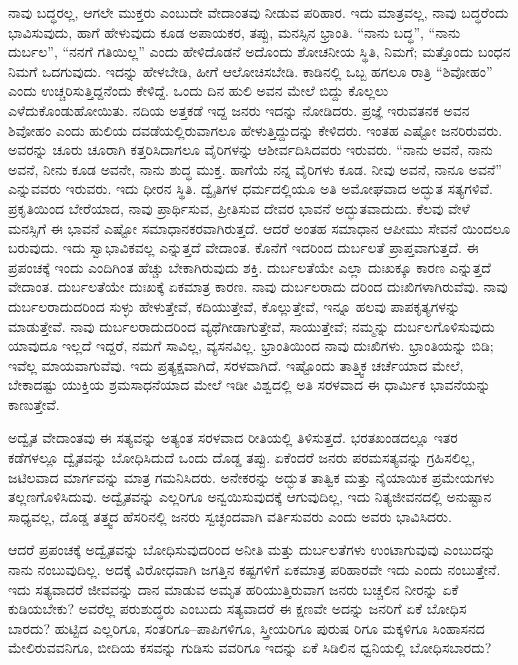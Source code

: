 ನಾವು ಬದ್ಧರಲ್ಲ, ಆಗಲೇ ಮುಕ್ತರು ಎಂಬುದೇ ವೇದಾಂತವು ನೀಡುವ ಪರಿಹಾರ. ಇದು ಮಾತ್ರವಲ್ಲ, ನಾವು ಬದ್ಧರೆಂದು ಭಾವಿಸುವುದು, ಹಾಗೆ ಹೇಳುವುದು ಕೂಡ ಅಪಾಯಕರ, ತಪ್ಪು, ಮನಸ್ಸಿನ ಭ್ರಾಂತಿ. “ನಾನು ಬದ್ಧ”, “ನಾನು ದುರ್ಬಲ”, “ನನಗೆ ಗತಿಯಿಲ್ಲ” ಎಂದು ಹೇಳಿದೊಡನೆ ಅದೊಂದು ಶೋಚನೀಯ ಸ್ಥಿತಿ, ನಿಮಗೆ; ಮತ್ತೊಂದು ಬಂಧನ ನಿಮಗೆ ಒದಗುವುದು. ಇದನ್ನು ಹೇಳಬೇಡಿ, ಹೀಗೆ ಆಲೋಚಿಸಬೇಡಿ. ಕಾಡಿನಲ್ಲಿ ಒಬ್ಬ ಹಗಲೂ ರಾತ್ರಿ “ಶಿವೋಹಂ” ಎಂದು ಉಚ್ಚರಿಸುತ್ತಿದ್ದನೆಂದು ಕೇಳಿದ್ದೆ. ಒಂದು ದಿನ ಹುಲಿ ಅವನ ಮೇಲೆ ಬಿದ್ದು ಕೊಲ್ಲಲು ಎಳೆದುಕೊಂಡುಹೋಯಿತು. ನದಿಯ ಅತ್ತಕಡೆ ಇದ್ದ ಜನರು ಇದನ್ನು ನೋಡಿದರು. ಪ್ರಜ್ಞೆ ಇರುವತನಕ ಅವನ ಶಿವೋಹಂ ಎಂದು ಹುಲಿಯ ದವಡೆಯಲ್ಲಿರುವಾಗಲೂ ಹೇಳುತ್ತಿದ್ದುದನ್ನು ಕೇಳಿದರು. ಇಂತಹ ಎಷ್ಟೋ ಜನರಿರುವರು. ಅವರನ್ನು ಚೂರು ಚೂರಾಗಿ ಕತ್ತರಿಸಿದಾಗಲೂ ವೈರಿಗಳನ್ನು ಆಶೀರ್ವದಿಸಿದವರು ಇರುವರು. “ನಾನು ಅವನೆ, ನಾನು ಅವನೆ, ನೀನು ಕೂಡ ಅವನೇ, ನಾನು ಶುದ್ಧ ಮುಕ್ತ. ಹಾಗೆಯೆ ನನ್ನ ವೈರಿಗಳು ಕೂಡ. ನೀವು ಅವನೆ, ನಾನೂ ಅವನೆ” ಎನ್ನುವವರು ಇರುವರು. ಇದು ಧೀರನ ಸ್ಥಿತಿ. ದ್ವೈತಿಗಳ ಧರ್ಮದಲ್ಲಿಯೂ ಅತಿ ಅಮೋಘವಾದ ಅದ್ಭುತ ಸತ್ಯಗಳಿವೆ. ಪ್ರಕೃತಿಯಿಂದ ಬೇರೆಯಾದ, ನಾವು ಪ್ರಾರ್ಥಿಸುವ, ಪ್ರೀತಿಸುವ ದೇವರ ಭಾವನೆ ಅದ್ಭುತವಾದುದು. ಕೆಲವು ವೇಳೆ ಮನಸ್ಸಿಗೆ ಈ ಭಾವನೆ ಎಷ್ಟೋ ಸಮಾಧಾನಕರವಾಗಿರುತ್ತದೆ. ಆದರೆ ಅಂತಹ ಸಮಾಧಾನ ಆಪೀಮು ಸೇವನೆ ಯಿಂದಲೂ ಬರುವುದು. ಇದು ಸ್ವಾಭಾವಿಕವಲ್ಲ ಎನ್ನುತ್ತದೆ ವೇದಾಂತ. ಕೊನೆಗೆ ಇದರಿಂದ ದುರ್ಬಲತೆ ಪ್ರಾಪ್ತವಾಗುತ್ತದೆ. ಈ ಪ್ರಪಂಚಕ್ಕೆ ಇಂದು ಎಂದಿಗಿಂತ ಹೆಚ್ಚು ಬೇಕಾಗಿರುವುದು ಶಕ್ತಿ. ದುರ್ಬಲತೆಯೇ ಎಲ್ಲಾ ದುಃಖಕ್ಕೂ ಕಾರಣ ಎನ್ನುತ್ತದೆ ವೇದಾಂತ. ದುರ್ಬಲತೆಯೇ ದುಃಖಕ್ಕೆ ಏಕಮಾತ್ರ ಕಾರಣ. ನಾವು ದುರ್ಬಲರಾದು ದರಿಂದ ದುಃಖಿಗಳಾಗಿರುವೆವು. ನಾವು ದುರ್ಬಲರಾದುದರಿಂದ ಸುಳ್ಳು ಹೇಳುತ್ತೇವೆ, ಕದಿಯುತ್ತೇವೆ, ಕೊಲ್ಲುತ್ತೇವೆ, ಇನ್ನೂ ಹಲವು ಪಾಪಕೃತ್ಯಗಳನ್ನು ಮಾಡುತ್ತೇವೆ. ನಾವು ದುರ್ಬಲರಾದುದರಿಂದ ವ್ಯಥೆಗೀಡಾಗುತ್ತೇವೆ, ಸಾಯುತ್ತೇವೆ; ನಮ್ಮನ್ನು ದುರ್ಬಲಗೊಳಿಸುವುದು ಯಾವುದೂ ಇಲ್ಲದೆ ಇದ್ದರೆ, ನಮಗೆ ಸಾವಿಲ್ಲ, ವ್ಯಸನವಿಲ್ಲ. ಭ್ರಾಂತಿಯಿಂದ ನಾವು ದುಃಖಿಗಳು. ಭ್ರಾಂತಿಯನ್ನು ಬಿಡಿ; ಇವೆಲ್ಲ ಮಾಯವಾಗುವೆವು. ಇದು ಪ್ರತ್ಯಕ್ಷವಾಗಿದೆ, ಸರಳವಾಗಿದೆ. ಇಷ್ಟೊಂದು ತಾತ್ತ್ವಿಕ ಚರ್ಚೆಯಾದ ಮೇಲೆ, ಬೇಕಾದಷ್ಟು ಯುಕ್ತಿಯ ಶ್ರಮಸಾಧನೆಯಾದ ಮೇಲೆ ಇಡೀ ವಿಶ್ವದಲ್ಲಿ ಅತಿ ಸರಳವಾದ ಈ ಧಾರ್ಮಿಕ ಭಾವನೆಯನ್ನು ಕಾಣುತ್ತೇವೆ.

ಅದ್ವೈತ ವೇದಾಂತವು ಈ ಸತ್ಯವನ್ನು ಅತ್ಯಂತ ಸರಳವಾದ ರೀತಿಯಲ್ಲಿ ತಿಳಿಸುತ್ತದೆ. ಭರತಖಂಡದಲ್ಲೂ ಇತರ ಕಡೆಗಳಲ್ಲೂ ದ್ವೈತವನ್ನು ಬೋಧಿಸಿದುದೆ ಒಂದು ದೊಡ್ಡ ತಪ್ಪು. ಏಕೆಂದರೆ ಜನರು ಪರಮಸತ್ಯವನ್ನು ಗ್ರಹಿಸಲಿಲ್ಲ, ಜಟಿಲವಾದ ಮಾರ್ಗವನ್ನು ಮಾತ್ರ ಗಮನಿಸಿದರು. ಅನೇಕರನ್ನು ಅದ್ಭುತ ತಾತ್ವಿಕ ಮತ್ತು ನೈಯಾಯಿಕ ಪ್ರಮೇಯಗಳು ತಲ್ಲಣಗೊಳಿಸಿದುವು. ಅದ್ವೈತವನ್ನು ಎಲ್ಲರಿಗೂ ಅನ್ವಯಿಸುವುದಕ್ಕೆ ಆಗುವುದಿಲ್ಲ, ಇದು ನಿತ್ಯಜೀವನದಲ್ಲಿ ಅನುಷ್ಟಾನ ಸಾಧ್ಯವಲ್ಲ, ದೊಡ್ಡ ತತ್ತ್ವದ ಹೆಸರಿನಲ್ಲಿ ಜನರು ಸ್ವಚ್ಛಂದವಾಗಿ ವರ್ತಿಸುವರು ಎಂದು ಅವರು ಭಾವಿಸಿದರು.

ಆದರೆ ಪ್ರಪಂಚಕ್ಕೆ ಅದ್ವೈತವನ್ನು ಬೋಧಿಸುವುದರಿಂದ ಅನೀತಿ ಮತ್ತು ದುರ್ಬಲತೆಗಳು ಉಂಟಾಗುವುವು ಎಂಬುದನ್ನು ನಾನು ನಂಬುವುದಿಲ್ಲ. ಅದಕ್ಕೆ ವಿರೋಧವಾಗಿ ಜಗತ್ತಿನ ಕಷ್ಟಗಳಿಗೆ ಏಕಮಾತ್ರ ಪರಿಹಾರವೇ ಇದು ಎಂದು ನಂಬುತ್ತೇನೆ. ಇದು ಸತ್ಯವಾದರೆ ಜೀವವನ್ನು ದಾನ ಮಾಡುವ ಅಮೃತ ಹರಿಯುತ್ತಿರುವಾಗ ಜನರು ಬಚ್ಚಲಿನ ನೀರನ್ನು ಏಕೆ ಕುಡಿಯಬೇಕು? ಅವರೆಲ್ಲ ಪರುಶುದ್ಧರು ಎಂಬುದು ಸತ್ಯವಾದರೆ ಈ ಕ್ಷಣವೇ ಅದನ್ನು ಜನರಿಗೆ ಏಕೆ ಬೋಧಿಸ ಬಾರದು? ಹುಟ್ಟಿದ ಎಲ್ಲರಿಗೂ, ಸಂತರಿಗೂ–ಪಾಪಿಗಳಿಗೂ, ಸ್ತ್ರೀಯರಿಗೂ ಪುರುಷ ರಿಗೂ ಮಕ್ಕಳಿಗೂ ಸಿಂಹಾಸನದ ಮೇಲಿರುವವನಿಗೂ, ಬೀದಿಯ ಕಸವನ್ನು ಗುಡಿಸು ವವರಿಗೂ ಇದನ್ನು ಏಕೆ ಸಿಡಿಲಿನ ಧ್ವನಿಯಲ್ಲಿ ಬೋಧಿಸಬಾರದು?

